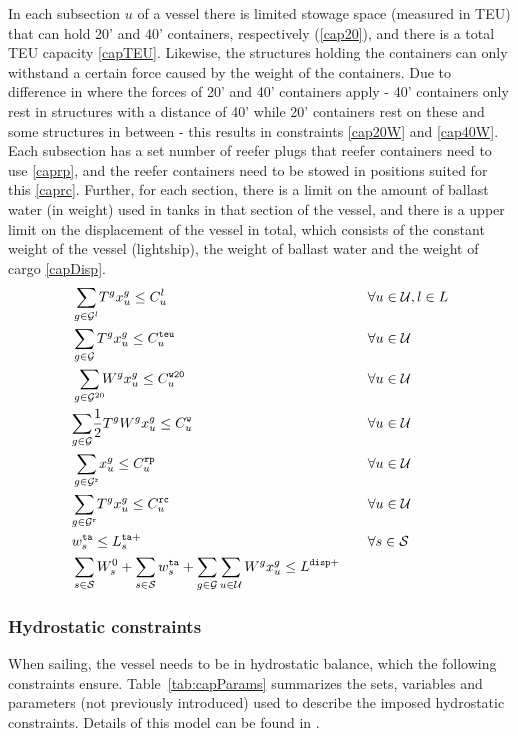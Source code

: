 In each subsection $u$ of a vessel there is limited stowage space (measured in TEU) that can hold 20' and 40' containers, respectively (\ref{cap20}), and there is a total TEU capacity \eqref{capTEU}. Likewise, the structures holding the containers can only withstand a certain force caused by the weight of the containers. Due to difference in where the forces of 20' and 40' containers apply - 40' containers only rest in structures with a distance of 40' while 20' containers rest on these and some structures in between - this results in constraints \eqref{cap20W} and \eqref{cap40W}.
Each subsection has a set number of reefer plugs that reefer containers need to use \eqref{caprp}, and the reefer containers need to be stowed in positions suited for this \eqref{caprc}.
Further, for each section, there is a limit on the amount of ballast water (in weight) used in tanks in that section of the vessel, and there is a upper limit on the displacement of the vessel in total, which consists of the constant weight of the vessel (lightship), the weight of ballast water and the weight of cargo \eqref{capDisp}.
\begin{alignat}{4}
&	\so[r]{\sum_{g\in \mc{G}^{l}}}T^gx^{g}_{u}\leq C^{l}_{u}   			&& \forall u\in \mc{U}, l\in L\label{cap20}\\
&	\so[r]{\sum_{g\in \mc{G}}}T^gx^{g}_{u} \leq C^\ttt{teu}_{u} 		&& \forall u\in \mc{U}\label{capTEU}\\
&	\so[r]{\sum_{g\in \mc{G}^{20}}}W^gx^{g}_{u}\leq C^\ttt{w20}_{u}    	&& \forall u\in \mc{U}\label{cap20W}\\
&	{\sum_{g\in \mc{G}}}\frac{1}{2}T^gW^gx^{g}_{u} \leq C^\ttt{w}_{u}	&& \forall u\in \mc{U}\label{cap40W}\\
&	\so[r]{\sum_{g\in \mc{G}^\ttt{r}}}x^{g}_{u}\leq C^\ttt{rp}_{u}		&& \forall u\in \mc{U}\label{caprp}\\
&	{\sum_{g\in \mc{G}^\ttt{r}}}T^gx^{g}_{u} \leq C^\ttt{rc}_{u} 		&& \forall u\in \mc{U}\label{caprc}\\
& w^{\ttt{ta}}_s \leq L^{\ttt{ta}+}_s									&& \forall s\in \mc{S}\label{capballast}\\
& \sum_{s\in\mc{S}}W^0_s + \sum_{s\in\mc{S}} w^\ttt{ta}_s + \sum_{g\in \mc{G}}\sum_{u\in\mc{U}}W^g x^g_u\leq L^{\ttt{disp}+}\quad \label{capDisp}
\end{alignat}

\subsubsection{Hydrostatic constraints}
When sailing, the vessel needs to be in hydrostatic balance, which the following constraints ensure. Table~\ref{tab:capParams} summarizes the sets, variables and parameters (not previously introduced) used to describe the imposed hydrostatic constraints. Details of this model can be found in \cite{iccl18}.

